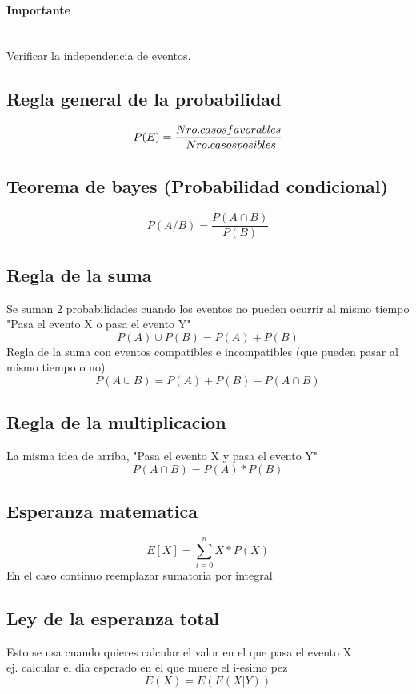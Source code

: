 \paragraph{Importante} \ \\
Verificar la independencia de eventos.\\
\subsection{Regla general de la probabilidad}{
$$P(E) = \frac{\newline Nro. casos favorables}{\newline Nro. casos posibles}$$
\subsection{Teorema de bayes (Probabilidad condicional)}
$$P(A/B) = \frac{P(A \cap B)}{P(B)}$$
}

\subsection{Regla de la suma}{
Se suman 2 probabilidades cuando los eventos no pueden ocurrir al mismo tiempo\\
"Pasa el evento X o pasa el evento Y"\\
$$P(A) \cup P(B) = P(A) + P(B)$$
Regla de la suma con eventos compatibles e incompatibles (que pueden pasar al mismo tiempo o no)\\
$$P(A \cup B) = P(A) + P(B) - P(A \cap B)$$

}
\subsection{Regla de la multiplicacion}{
La misma idea de arriba, "Pasa el evento X y pasa el evento Y"
$$P(A \cap B) = P(A) * P(B)$$

}
\subsection{Esperanza matematica}{
$$E[X] = \sum_{i=0}^n X * P(X)$$
En el caso continuo reemplazar sumatoria por integral
}
\subsection{Ley de la esperanza total}{
Esto se usa cuando quieres calcular el valor en el que pasa el evento X\\
ej. calcular el dia esperado en el que muere el i-esimo pez
$$E(X) = E(E(X | Y))$$
}
